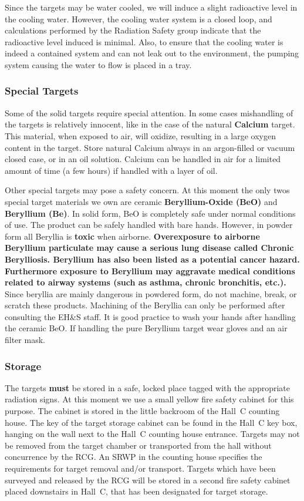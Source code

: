Since the targets may be water cooled, we will induce a slight
radioactive level in the cooling water. However, the cooling water
system is a closed loop, and calculations performed by the Radiation
Safety group indicate that the radioactive level induced is minimal.
Also, to ensure that the cooling water is indeed a contained system
and can not leak out to the environment, the pumping system causing
the water to flow is placed in a tray.

\subsubsection{Special Targets}

Some of the solid targets require special attention. In some cases
mishandling of the targets is relatively innocent, like in the case
of the natural {\bf Calcium} target. This material, when exposed to air,
will oxidize, resulting in a large oxygen content in the target.
Store natural Calcium always in an argon-filled or vacuum closed
case, or in an oil solution. Calcium can be handled in air for a limited
amount of time (a few hours) if handled with a layer of oil.

Other special targets may pose a safety concern. At this
moment the only twos special target materials we own are ceramic
{\bf Beryllium-Oxide (BeO)} and {\bf Beryllium (Be)}.
In solid form, BeO is completely safe under normal conditions of use.
The product can be safely handled with bare hands.
However, in powder form all Beryllia is {\bf toxic} when airborne.
{\bf Overexposure to airborne Beryllium particulate may cause a
serious lung disease called Chronic Berylliosis. Beryllium has also
been listed as a potential cancer hazard. Furthermore exposure to
Beryllium may aggravate medical conditions related to airway systems
(such as asthma, chronic bronchitis, etc.).}
Since beryllia are mainly dangerous in powdered form, do not machine,
break, or scratch these products. Machining of the Beryllia can only
be performed after consulting the EH\&S staff.
It is good practice to wash your
hands after handling the ceramic BeO. If handling the pure Beryllium
target wear gloves and an air filter mask.

\subsubsection{Storage}

The targets {\bf must} be stored in a safe, locked place tagged with the
appropriate radiation signs. At this moment we use a small yellow
fire safety cabinet for this purpose. The cabinet is stored in the
little backroom of the Hall~C counting house. The key of the target
storage cabinet can be found in the Hall~C key box, hanging on the
wall next to the Hall~C counting house entrance.
Targets may not be removed from the target chamber or transported from the hall without 
concurrence by the RCG.  An SRWP in the counting house specifies the requirements for 
target removal and/or transport.  Targets which have been surveyed and released by the 
RCG will be stored in a second fire safety cabinet placed downstairs in Hall~C,
that has been designated for target storage.

